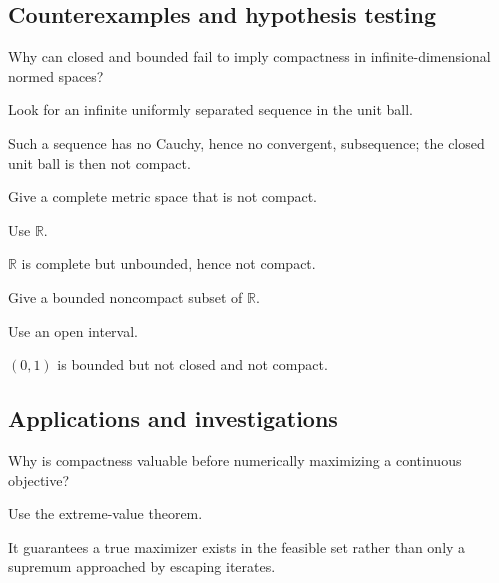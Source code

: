 \subsection*{Counterexamples and hypothesis testing}

\begin{exercise}\label{exr:ii06-expand-10}
Why can closed and bounded fail to imply compactness in infinite-dimensional normed spaces?
\end{exercise}
\begin{hint}
Look for an infinite uniformly separated sequence in the unit ball.
\end{hint}
\begin{solution}
Such a sequence has no Cauchy, hence no convergent, subsequence; the closed unit ball is then not compact.
\end{solution}

\begin{exercise}\label{exr:ii06-expand-11}
Give a complete metric space that is not compact.
\end{exercise}
\begin{hint}
Use \(\mathbb R\).
\end{hint}
\begin{solution}
\(\mathbb R\) is complete but unbounded, hence not compact.
\end{solution}

\begin{exercise}\label{exr:ii06-expand-12}
Give a bounded noncompact subset of \(\mathbb R\).
\end{exercise}
\begin{hint}
Use an open interval.
\end{hint}
\begin{solution}
\((0,1)\) is bounded but not closed and not compact.
\end{solution}

\subsection*{Applications and investigations}

\begin{exercise}\label{exr:ii06-expand-13}
Why is compactness valuable before numerically maximizing a continuous objective?
\end{exercise}
\begin{hint}
Use the extreme-value theorem.
\end{hint}
\begin{solution}
It guarantees a true maximizer exists in the feasible set rather than only a supremum approached by escaping iterates.
\end{solution}

